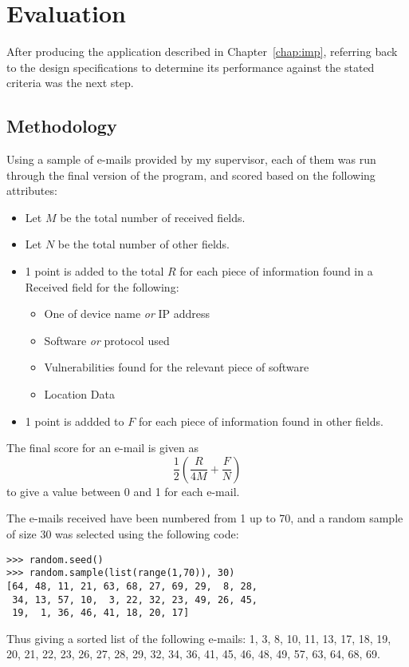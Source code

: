 \chapter{Evaluation}\label{chap:test}
After producing the application described in Chapter~\ref{chap:imp}, referring
back to the design specifications to determine its performance against the
stated criteria was the next step.  

\section{Methodology}
Using a sample of e-mails provided by my supervisor, each of them was run
through the final version of the program, and scored based on the following
attributes:

\begin{itemize}
\item Let $M$ be the total number of received fields.
\item Let $N$ be the total number of other fields.
\item 1 point is added to the total $R$ for each piece of information found in a Received field for the following:
\begin{itemize}
\item{One of device name \emph{or} IP address}
\item{Software \emph{or} protocol used}
\item{Vulnerabilities found for the relevant piece of software}
\item{Location Data}
\end{itemize}
\item 1 point is addded to $F$ for each piece of information found in other fields.
\end{itemize}

The final score for an e-mail is given as \[\frac12\left(\frac R{4M}+\frac
FN\right)\]to give a value between 0 and 1 for each e-mail.

The e-mails received have been numbered from 1 up to 70, and a random sample of
size 30 was selected using the following code:

\begin{verbatim}
>>> random.seed()
>>> random.sample(list(range(1,70)), 30)
[64, 48, 11, 21, 63, 68, 27, 69, 29,  8, 28,
 34, 13, 57, 10,  3, 22, 32, 23, 49, 26, 45,
 19,  1, 36, 46, 41, 18, 20, 17]
\end{verbatim}

Thus giving a sorted list of the following e-mails: 1, 3, 8, 10, 11, 13, 17,
18, 19, 20, 21, 22, 23, 26, 27, 28, 29, 32, 34, 36, 41, 45, 46, 48, 49, 57, 63,
64, 68, 69.

